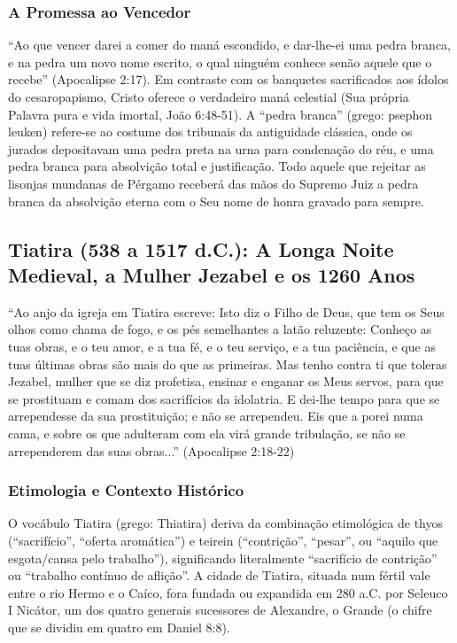 \subsubsection*{A Promessa ao Vencedor}
``Ao que vencer darei a comer do maná escondido, e dar-lhe-ei uma pedra branca, e na pedra um novo nome escrito, o qual ninguém conhece senão aquele que o recebe'' (Apocalipse 2:17). Em contraste com os banquetes sacrificados aos ídolos do cesaropapismo, Cristo oferece o verdadeiro maná celestial (Sua própria Palavra pura e vida imortal, João 6:48-51). A ``pedra branca'' (grego: psephon leuken) refere-se ao costume dos tribunais da antiguidade clássica, onde os jurados depositavam uma pedra preta na urna para condenação do réu, e uma pedra branca para absolvição total e justificação. Todo aquele que rejeitar as lisonjas mundanas de Pérgamo receberá das mãos do Supremo Juiz a pedra branca da absolvição eterna com o Seu nome de honra gravado para sempre.



\subsection{Tiatira (538 a 1517 d.C.): A Longa Noite Medieval, a Mulher Jezabel e os 1260 Anos}


``Ao anjo da igreja em Tiatira escreve: Isto diz o Filho de Deus, que tem os Seus olhos como chama de fogo, e os pés semelhantes a latão reluzente: Conheço as tuas obras, e o teu amor, e a tua fé, e o teu serviço, e a tua paciência, e que as tuas últimas obras são mais do que as primeiras. Mas tenho contra ti que toleras Jezabel, mulher que se diz profetisa, ensinar e enganar os Meus servos, para que se prostituam e comam dos sacrifícios da idolatria. E dei-lhe tempo para que se arrependesse da sua prostituição; e não se arrependeu. Eis que a porei numa cama, e sobre os que adulteram com ela virá grande tribulação, se não se arrependerem das suas obras...'' (Apocalipse 2:18-22)


\subsubsection*{Etimologia e Contexto Histórico}
O vocábulo Tiatira (grego: Thiatira) deriva da combinação etimológica de thyos (``sacrifício'', ``oferta aromática'') e teirein (``contrição'', ``pesar'', ou ``aquilo que esgota/cansa pelo trabalho''), significando literalmente ``sacrifício de contrição'' ou ``trabalho contínuo de aflição''. A cidade de Tiatira, situada num fértil vale entre o rio Hermo e o Caíco, fora fundada ou expandida em 280 a.C. por Seleuco I Nicátor, um dos quatro generais sucessores de Alexandre, o Grande (o chifre que se dividiu em quatro em Daniel 8:8).


